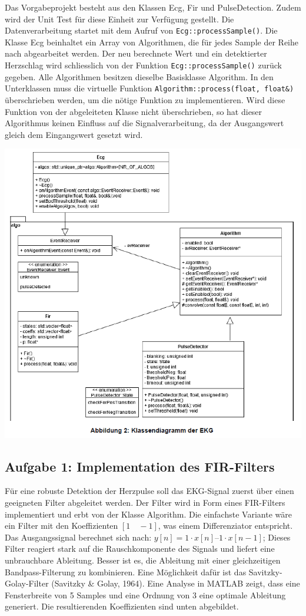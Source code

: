 Das Vorgabeprojekt besteht aus den Klassen Ecg, Fir und PulseDetection. Zudem wird der Unit Test für diese Einheit zur Verfügung gestellt. Die Datenverarbeitung startet mit dem Aufruf von \texttt{Ecg::processSample()}. Die Klasse Ecg beinhaltet ein Array von Algorithmen, die für jedes Sample der Reihe nach abgearbeitet werden. Der neu berechnete Wert und ein detektierter Herzschlag wird schliesslich von der Funktion \texttt{Ecg::processSample()} zurück gegeben. Alle Algorithmen besitzen dieselbe Basisklasse Algorithm. In den Unterklassen muss die virtuelle Funktion \texttt{Algorithm::process(float, float\&)} überschrieben werden, um die nötige Funktion zu implementieren. Wird diese Funktion von der abgeleiteten Klasse nicht überschrieben, so hat dieser Algorithmus keinen Einfluss auf die Signalverarbeitung, da der Ausgangswert gleich dem Eingangswert gesetzt wird.
\begin{center}
  \includegraphics[width=1\linewidth]{900-Praktika/prak08/2.PNG}
\end{center}

\subsection{Aufgabe 1: Implementation des FIR-Filters}
Für eine robuste Detektion der Herzpulse soll das EKG-Signal zuerst über einen geeigneten Filter abgeleitet werden. Der Filter wird in Form eines FIR-Filters implementiert und erbt von der Klasse Algorithm. Die einfachste Variante wäre ein Filter mit den Koeffizienten $[1 \quad -1]$, was einem Differenziator entspricht. Das Ausgangssignal berechnet sich nach: $y[n] = 1\cdot x[n] – 1 \cdot x[n-1]$;
Dieses Filter reagiert stark auf die Rauschkomponente des Signals und liefert eine unbrauchbare Ableitung. Besser ist es, die Ableitung mit einer gleichzeitigen Bandpass-Filterung zu kombinieren. Eine Möglichkeit dafür ist das Savitzky-Golay-Filter (Savitzky \& Golay, 1964). Eine Analyse in MATLAB zeigt, dass eine Fensterbreite von 5 Samples und eine Ordnung von 3 eine optimale Ableitung generiert. Die resultierenden Koeffizienten sind unten abgebildet.

